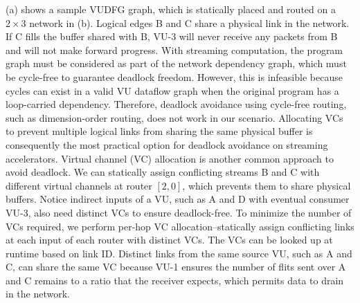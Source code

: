 (a) shows a sample VUDFG graph, which is statically placed and routed on a $2\times3$ network in (b). 
Logical edges B and C share a physical link in the network. If C fills the buffer shared with B, VU-3 will never receive any packets from B and will not make forward progress.
  With streaming computation, the program graph must be considered as part of the network dependency graph, which must be cycle-free to guarantee deadlock freedom. However, this is infeasible because cycles can exist in a valid VU dataflow graph when the original program has a loop-carried dependency. Therefore, deadlock avoidance using cycle-free routing, such as dimension-order routing, does not work in our scenario. 
Allocating VCs to prevent multiple logical links from sharing the same physical buffer is consequently the most practical option for deadlock avoidance on streaming accelerators.
Virtual channel (VC) allocation is another common approach to avoid deadlock. We can statically assign conflicting streams B and C with different
virtual channels at router $[2,0]$, which prevents them to share physical buffers. 
Notice indirect inputs of a VU, such as A and D with eventual consumer VU-3,
also need distinct VCs to ensure deadlock-free. To minimize the number of VCs required, we perform per-hop VC allocation--statically
assign conflicting links at each input of each router with distinct VCs. The VCs can be looked up at runtime based on link ID.
Distinct links from the same source VU, such as A and C, can share the same VC because VU-1 ensures the number of flits sent over A and C remains
to a ratio that the receiver expects, which permits data to drain in the network.
\fi

